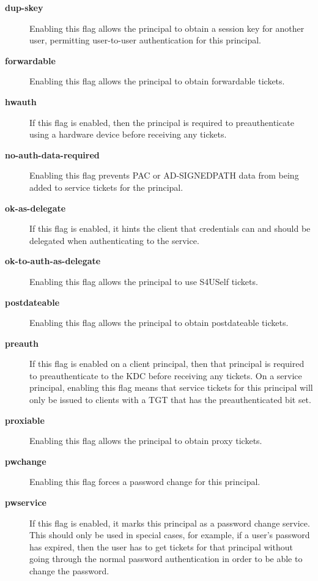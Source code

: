 \documentclass[letterpaper,10pt,english]{sphinxmanual}
\begin{document}
\begin{description}
\begin{description}
\item[{\textbf{dup-skey}}] \leavevmode
Enabling this flag allows the principal to obtain a session
key for another user, permitting user-to-user authentication
for this principal.

\item[{\textbf{forwardable}}] \leavevmode
Enabling this flag allows the principal to obtain forwardable
tickets.

\item[{\textbf{hwauth}}] \leavevmode
If this flag is enabled, then the principal is required to
preauthenticate using a hardware device before receiving any
tickets.

\item[{\textbf{no-auth-data-required}}] \leavevmode
Enabling this flag prevents PAC or AD-SIGNEDPATH data from
being added to service tickets for the principal.

\item[{\textbf{ok-as-delegate}}] \leavevmode
If this flag is enabled, it hints the client that credentials
can and should be delegated when authenticating to the
service.

\item[{\textbf{ok-to-auth-as-delegate}}] \leavevmode
Enabling this flag allows the principal to use S4USelf tickets.

\item[{\textbf{postdateable}}] \leavevmode
Enabling this flag allows the principal to obtain postdateable
tickets.

\item[{\textbf{preauth}}] \leavevmode
If this flag is enabled on a client principal, then that
principal is required to preauthenticate to the KDC before
receiving any tickets.  On a service principal, enabling this
flag means that service tickets for this principal will only
be issued to clients with a TGT that has the preauthenticated
bit set.

\item[{\textbf{proxiable}}] \leavevmode
Enabling this flag allows the principal to obtain proxy
tickets.

\item[{\textbf{pwchange}}] \leavevmode
Enabling this flag forces a password change for this
principal.

\item[{\textbf{pwservice}}] \leavevmode
If this flag is enabled, it marks this principal as a password
change service.  This should only be used in special cases,
for example, if a user's password has expired, then the user
has to get tickets for that principal without going through
the normal password authentication in order to be able to
change the password.


\end{description}
\end{description}
\end{document}
